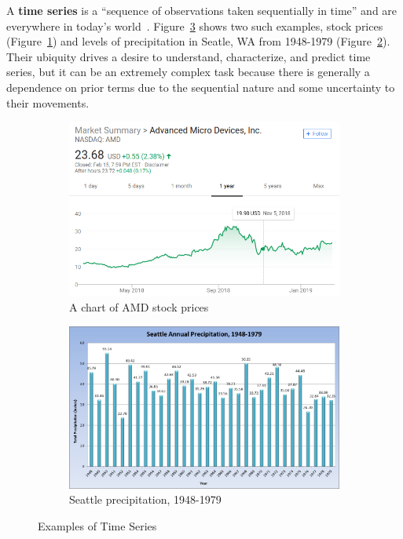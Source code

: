 \documentclass[oneside,12pt,openany]{book}
\begin{document}
	A \textbf{time series} is a ``sequence of observations taken sequentially in time'' and are everywhere in today's world~\cite{Box}. Figure~\ref{fig:TimeSeriesExamples} shows two such examples, stock prices (Figure~\ref{fig:AMDChart}) and levels of precipitation in Seatle, WA from 1948-1979 (Figure~\ref{fig:SeattlePrecip}). Their ubiquity drives a desire to understand, characterize, and predict time series, but it can be an extremely complex task because there is generally a dependence on prior terms due to the sequential nature and some uncertainty to their movements.
	
	\begin{figure}[!ht]
		\centering
		\begin{subfigure}[b]{.45\textwidth}
			\includegraphics[width=\textwidth]{images/AMDChart.png}
			\caption{A chart of AMD stock prices}
			\label{fig:AMDChart}
		\end{subfigure}
		\begin{subfigure}[b]{.45\textwidth}
			\includegraphics[width=\textwidth]{images/SeattleRainfall.png}
			\caption{Seattle precipitation, 1948-1979}
			\label{fig:SeattlePrecip}
		\end{subfigure}
		\caption[Examples of Time Series]{Examples of Time Series \footnotemark}
		\label{fig:TimeSeriesExamples}
			
	\end{figure}
\end{document}
